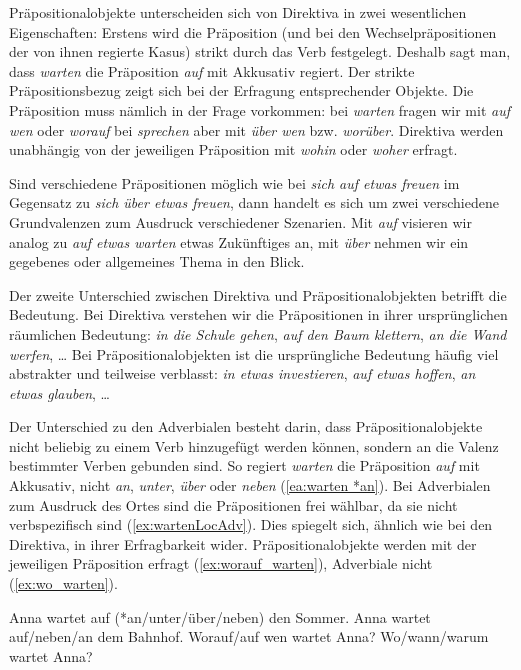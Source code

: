 Präpositionalobjekte unterscheiden sich von Direktiva in zwei wesentlichen Eigenschaften: Erstens wird die Präposition (und bei den Wechselpräpositionen der von ihnen regierte Kasus) strikt durch das Verb festgelegt. Deshalb sagt man, dass \textit{warten} die Präposition \textit{auf} mit Akkusativ regiert. Der strikte Präpositionsbezug zeigt sich bei der Erfragung entsprechender Objekte. Die Präposition muss nämlich in der Frage vorkommen: bei \textit{warten} fragen wir mit \textit{auf wen} oder \textit{worauf} bei \textit{sprechen} aber mit \textit{über wen} bzw. \textit{worüber}. Direktiva werden unabhängig von der jeweiligen Präposition mit \textit{wohin} oder \textit{woher} erfragt. 

Sind verschiedene Präpositionen möglich wie bei \textit{sich auf etwas freuen} im Gegensatz zu \textit{sich über etwas freuen}, dann handelt es sich um zwei verschiedene Grundvalenzen zum Ausdruck verschiedener Szenarien. Mit \textit{auf} visieren wir analog zu \textit{auf etwas warten} etwas Zukünftiges an, mit \textit{über} nehmen wir ein gegebenes oder allgemeines Thema in den Blick. 

Der zweite Unterschied zwischen Direktiva und Präpositionalobjekten betrifft die Bedeutung. Bei Direktiva verstehen wir die Präpositionen in ihrer ursprünglichen räumlichen Bedeutung: \textit{in die Schule gehen}, \textit{auf den Baum klettern}, \textit{an die Wand werfen}, \ldots{} Bei Präpositionalobjekten ist die ursprüngliche Bedeutung häufig viel abstrakter und teilweise verblasst: \textit{in etwas investieren}, \textit{auf etwas hoffen}, \textit{an etwas glauben}, \ldots{}  

Der Unterschied zu den Adverbialen besteht darin, dass Präpositionalobjekte nicht beliebig zu einem Verb hinzugefügt werden können, sondern an die Valenz bestimmter Verben gebunden sind. So regiert \textit{warten} die Präposition \textit{auf} mit Akkusativ, nicht \textit{an}, \textit{unter}, \textit{über} oder \textit{neben} (\ref{ea:warten *an}). Bei Adverbialen zum Ausdruck des Ortes sind die Präpositionen frei wählbar, da sie nicht verbspezifisch sind (\ref{ex:wartenLocAdv}). Dies spiegelt sich, ähnlich wie bei den Direktiva, in ihrer Erfragbarkeit wider. Präpositionalobjekte werden mit der jeweiligen Präposition erfragt (\ref{ex:worauf_warten}), Adverbiale nicht (\ref{ex:wo_warten}).

\ea \label{ea:PobjvsAdv}
\ea \label{ea:warten *an} Anna wartet auf (*an/unter/über/neben) den Sommer.
\ex \label{ex:wartenLocAdv} Anna wartet auf/neben/an dem Bahnhof.
\ex \label{ex:worauf_warten} Worauf/auf wen wartet Anna?
\ex \label{ex:wo_warten} Wo/wann/warum wartet Anna?
\z 
\z


